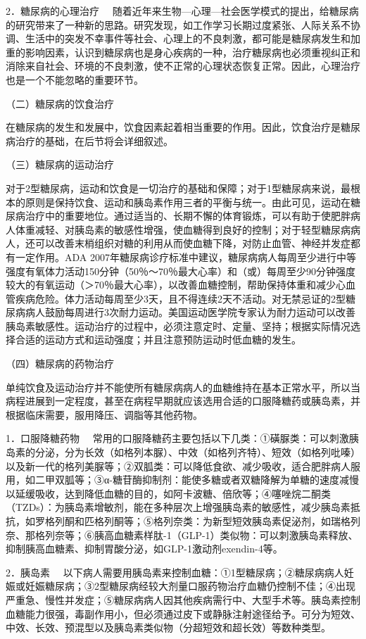 {2．糖尿病的心理治疗}
　随着近年来生物---心理---社会医学模式的提出，给糖尿病的研究带来了一种新的思路。研究发现，如工作学习长期过度紧张、人际关系不协调、生活中的突发不幸事件等社会、心理上的不良刺激，都可能是糖尿病发生和加重的影响因素，认识到糖尿病也是身心疾病的一种，治疗糖尿病也必须重视纠正和消除来自社会、环境的不良刺激，使不正常的心理状态恢复正常。因此，心理治疗也是一个不能忽略的重要环节。

（二）糖尿病的饮食治疗

在糖尿病的发生和发展中，饮食因素起着相当重要的作用。因此，饮食治疗是糖尿病治疗的基础，在后节将会详细叙述。

（三）糖尿病的运动治疗

对于2型糖尿病，运动和饮食是一切治疗的基础和保障；对于1型糖尿病来说，最根本的原则是保持饮食、运动和胰岛素作用三者的平衡与统一。由此可见，运动在糖尿病治疗中的重要地位。通过适当的、长期不懈的体育锻炼，可以有助于使肥胖病人体重减轻、对胰岛素的敏感性增强，使血糖得到良好的控制；对于轻型糖尿病病人，还可以改善末梢组织对糖的利用从而使血糖下降，对防止血管、神经并发症都有一定作用。ADA
2007年糖尿病诊疗标准中建议，糖尿病病人每周至少进行中等强度有氧体力活动150分钟（50％～70％最大心率）和（或）每周至少90分钟强度较大的有氧运动（＞70％最大心率），以改善血糖控制，帮助保持体重和减少心血管疾病危险。体力活动每周至少3天，且不得连续2天不活动。对无禁忌证的2型糖尿病病人鼓励每周进行3次耐力运动。美国运动医学院专家认为耐力运动可以改善胰岛素敏感性。运动治疗的过程中，必须注意定时、定量、坚持；根据实际情况选择合适的运动方式和运动强度；并且注意预防运动时低血糖的发生。

（四）糖尿病的药物治疗

单纯饮食及运动治疗并不能使所有糖尿病病人的血糖维持在基本正常水平，所以当病程进展到一定程度，甚至在病程早期就应该选用合适的口服降糖药或胰岛素，并根据临床需要，服用降压、调脂等其他药物。

{1．口服降糖药物}
　常用的口服降糖药主要包括以下几类：①磺脲类：可以刺激胰岛素的分泌，分为长效（如格列本脲）、中效（如格列齐特）、短效（如格列吡嗪）以及新一代的格列美脲等；②双胍类：可以降低食欲、减少吸收，适合肥胖病人服用，如二甲双胍等；③α-糖苷酶抑制剂：能使多糖或者双糖降解为单糖的速度减慢以延缓吸收，达到降低血糖的目的，如阿卡波糖、倍欣等；④噻唑烷二酮类（TZDs）：为胰岛素增敏剂，能在多种层次上增强胰岛素的敏感性，减少胰岛素抵抗，如罗格列酮和匹格列酮等；⑤格列奈类：为新型短效胰岛素促泌剂，如瑞格列奈、那格列奈等；⑥胰高血糖素样肽-1（GLP-1）类似物：可以刺激胰岛素释放、抑制胰高血糖素、抑制胃酸分泌，如GLP-1激动剂exendin-4等。

{2．胰岛素}
　以下病人需要用胰岛素来控制血糖：①1型糖尿病；②糖尿病病人妊娠或妊娠糖尿病；③2型糖尿病经较大剂量口服药物治疗血糖仍控制不佳；④出现严重急、慢性并发症；⑤糖尿病病人因其他疾病需行中、大型手术等。胰岛素控制血糖能力很强，毒副作用小，但必须通过皮下或静脉注射途径给予。可分为短效、中效、长效、预混型以及胰岛素类似物（分超短效和超长效）等数种类型。

